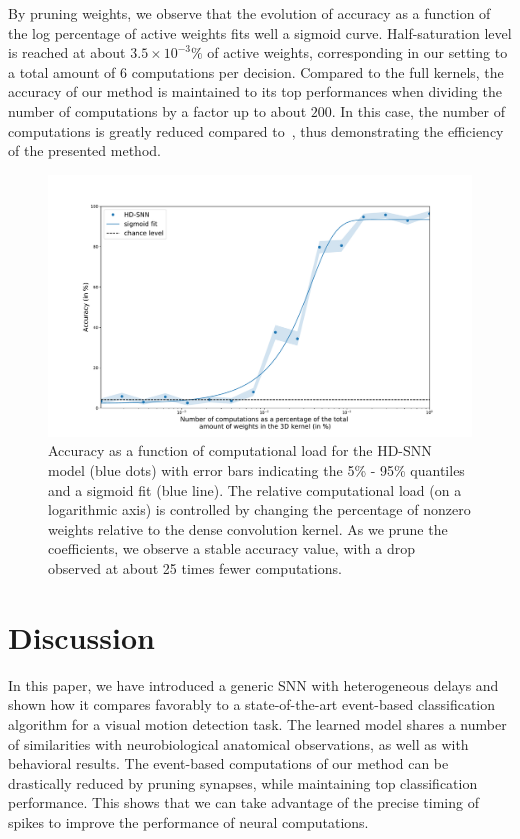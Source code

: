 \documentclass[default]{sn-jnl}%
\theoremstyle{thmstyleone}%
\theoremstyle{thmstyletwo}%
\theoremstyle{thmstylethree}%
\begin{document}
By pruning weights, we observe that the evolution of accuracy as a function of the log percentage of active weights fits well a sigmoid curve. Half-saturation level is reached at about $3.5\times 10^{-3}\%$ of active weights, corresponding in our setting to a total amount of $6$ computations per decision. Compared to the full kernels, the accuracy of our method is maintained to its top performances when dividing the number of computations by a factor up to about $200$. In this case, the number of computations is greatly reduced compared to~\citep{grimaldi_robust_2022}, thus demonstrating the efficiency of the presented method. 
%
\begin{figure}%
    \centering
    \includegraphics[width=0.95\linewidth]{figures/quant_accuracy.pdf}
    \caption{Accuracy as a function of computational load for the HD-SNN model (blue dots) with error bars indicating the 5\% - 95\% quantiles and a sigmoid fit (blue line). The relative computational load (on a logarithmic axis) is controlled by changing the percentage of nonzero weights relative to the dense convolution kernel. As we prune the coefficients, we observe a stable accuracy value, with a drop observed at about 25 times fewer computations.}
    \label{fig:accuracy}
\end{figure}
%
\section{Discussion}
In this paper, we have introduced a generic SNN with heterogeneous delays and shown how it compares favorably to a state-of-the-art event-based classification algorithm for a visual motion detection task. The learned model shares a number of similarities with neurobiological anatomical observations, as well as with behavioral results. The event-based computations of our method can be drastically reduced by pruning synapses, while maintaining top classification performance. This shows that we can take advantage of the precise timing of spikes to improve the performance of neural computations.
%
\end{document}
